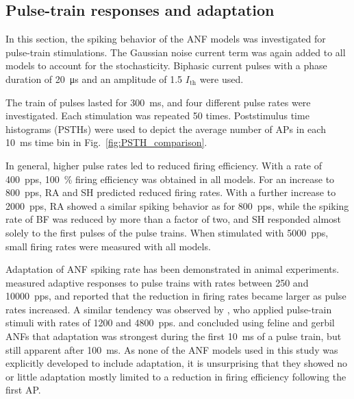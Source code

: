 \documentclass[utf8]{frontiersSCNS} %
\newcommand{\T}[1]{\text{#1}}
\begin{document}
\subsection{Pulse-train responses and adaptation}
\label{subsec:adaptation}
In this section, the spiking behavior of the ANF models was investigated for pulse-train stimulations. The Gaussian noise current term was again added to all models to account for the stochasticity. Biphasic current pulses with a phase duration of \SI{20}{\micro\second} and an amplitude of 1.5 $I_{\T{th}}$ were used.

The train of pulses lasted for \SI{300}{\milli\second}, and four different pulse rates were investigated. Each stimulation was repeated 50 times. Poststimulus time histograms (PSTHs) were used to depict the average number of APs in each \SI{10}{\milli\second} time bin in Fig.\ \ref{fig:PSTH_comparison}.

In general, higher pulse rates led to reduced firing efficiency. With a rate of \SI{400}{pps}, \SI{100}{\percent} firing efficiency was obtained in all models. For an increase to \SI{800}{pps}, RA and SH predicted reduced firing rates. With a further increase to \SI{2000}{pps}, RA showed a similar spiking behavior as for \SI{800}{pps}, while the spiking rate of BF was reduced by more than a factor of two, and SH responded almost solely to the first pulses of the pulse trains. When stimulated with \SI{5000}{pps}, small firing rates were measured with all models.

Adaptation of ANF spiking rate has been demonstrated in animal experiments. \cite{Zhang2007} measured adaptive responses to pulse trains with rates between 250 and \SI{10000}{pps}, and reported that the reduction in firing rates became larger as pulse rates increased. A similar tendency was observed by \cite{Litvak2001}, who applied pulse-train stimuli with rates of 1200 and \SI{4800}{pps}.
 \cite{Zhang2007} and \cite{Westerman1984} concluded using feline and gerbil ANFs that adaptation was strongest during the first \SI{10}{\milli\second} of a pulse train, but still apparent after \SI{100}{\milli\second}. As none of the ANF models used in this study was explicitly developed to include adaptation, it is unsurprising that they showed no or little adaptation mostly limited to a reduction in firing efficiency following the first AP.

\end{document}
